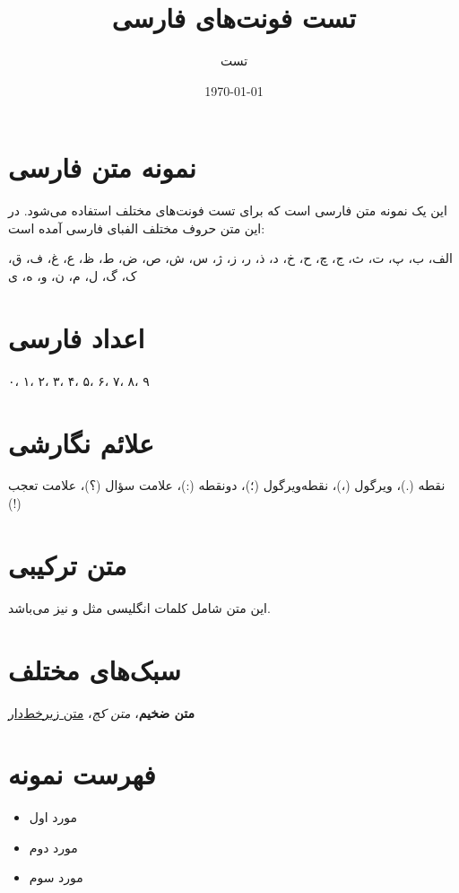 \documentclass[12pt,a4paper]{article}
\title{تست فونت‌های فارسی}
\author{تست}
\date{\today}
\begin{document}
\maketitle

\section{نمونه متن فارسی}

این یک نمونه متن فارسی است که برای تست فونت‌های مختلف استفاده می‌شود. در این متن حروف مختلف الفبای فارسی آمده است:

الف، ب، پ، ت، ث، ج، چ، ح، خ، د، ذ، ر، ز، ژ، س، ش، ص، ض، ط، ظ، ع، غ، ف، ق، ک، گ، ل، م، ن، و، ه، ی

\section{اعداد فارسی}
۰، ۱، ۲، ۳، ۴، ۵، ۶، ۷، ۸، ۹

\section{علائم نگارشی}
نقطه (.)، ویرگول (،)، نقطه‌ویرگول (؛)، دونقطه (:)، علامت سؤال (؟)، علامت تعجب (!)

\section{متن ترکیبی}
این متن شامل کلمات انگلیسی مثل  و  نیز می‌باشد.

\section{سبک‌های مختلف}
\textbf{متن ضخیم}، \textit{متن کج}، \underline{متن زیرخط‌دار}

\section{فهرست نمونه}
\begin{itemize}
\item مورد اول
\item مورد دوم  
\item مورد سوم
\end{itemize}
\end{document}
